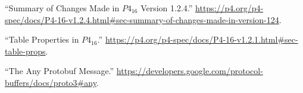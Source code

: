 \documentclass[11pt]{article}
\begin{document}
{{\begin{thebibliography}{45}
\mdbibitemlabel{{}[35]}\textquotedblleft{}Summary of Changes Made in $P4_{16}$ Version 1.2.4.\textquotedblright{} \href{https://p4.org/p4-spec/docs/P4-16-v1.2.4.html\%23sec-summary-of-changes-made-in-version-124}{{\ttfamily https://\hspace{0pt}p4.\hspace{0pt}org/\hspace{0pt}p4-\hspace{0pt}spec/\hspace{0pt}docs/\hspace{0pt}P4-\hspace{0pt}16-\hspace{0pt}v1.\hspace{0pt}2.\hspace{0pt}4.\hspace{0pt}html\#\hspace{0pt}sec-\hspace{0pt}summary-\hspace{0pt}of-\hspace{0pt}changes-\hspace{0pt}made-\hspace{0pt}in-\hspace{0pt}version-\hspace{0pt}124}}.\label{p4revisions124}%

\mdbibitemlabel{{}[36]}\textquotedblleft{}Table Properties in $P4_{16}$.\textquotedblright{} \href{https://p4.org/p4-spec/docs/P4-16-v1.2.1.html\%23sec-table-props}{{\ttfamily https://\hspace{0pt}p4.\hspace{0pt}org/\hspace{0pt}p4-\hspace{0pt}spec/\hspace{0pt}docs/\hspace{0pt}P4-\hspace{0pt}16-\hspace{0pt}v1.\hspace{0pt}2.\hspace{0pt}1.\hspace{0pt}html\#\hspace{0pt}sec-\hspace{0pt}table-\hspace{0pt}props}}.\label{p4tableproperties}%

\mdbibitemlabel{{}[37]}\textquotedblleft{}The Any Protobuf Message.\textquotedblright{} \href{https://developers.google.com/protocol-buffers/docs/proto3\%23any}{{\ttfamily https://\hspace{0pt}developers.\hspace{0pt}google.\hspace{0pt}com/\hspace{0pt}protocol-\hspace{0pt}buffers/\hspace{0pt}docs/\hspace{0pt}proto3\#\hspace{0pt}any}}.\label{protoany}%


\end{thebibliography}}}
\end{document}
